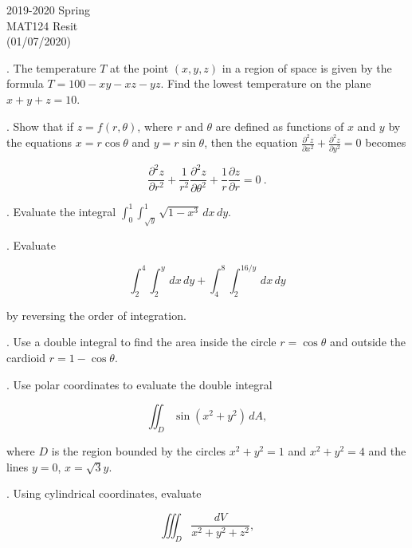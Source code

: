\documentclass{article}
\begin{document}
\large

\begin{center}
2019-2020 Spring \\MAT124 Resit\\(01/07/2020)
\end{center}

. The temperature $T$ at the point $(x,y,z)$ in a region of space is given by the formula $T=100-xy-xz-yz$. Find the lowest temperature on the plane $x+y+z=10$.

\hfill

. Show that if $z=f(r, \theta)$, where $r$ and $\theta$ are defined as functions of $x$ and $y$ by the equations $x=r\cos\theta$ and $y=r\sin\theta$, then the equation $\displaystyle\frac{\partial^2z}{\partial x^2}+\frac{\partial ^2z}{\partial y^2} = 0$ becomes

\begin{equation*}
    \frac{\partial^2z}{\partial r^2}+\frac{1}{r^2}\frac{\partial^2z}{\partial\theta^2}+\frac{1}{r}\frac{\partial z}{\partial r}  = 0\:.
\end{equation*}

\hfill

. Evaluate the integral $\displaystyle \int_0^1\int_{\sqrt y}^1 \sqrt{1-x^3}\,dx\,dy$.

\hfill

. Evaluate

\[\displaystyle \int_2^4\int_2^y\,dx\,dy + \int_4^8\int_2^{16/y}\,dx\,dy\]

\hfill

\noindent by reversing the order of integration.

\hfill

. Use a double integral to find the area inside the circle $r=\cos\theta$ and outside the cardioid $r=1-\cos\theta$.

\hfill

. Use polar coordinates to evaluate the double integral

\[\displaystyle\iint_D\sin\left(x^2+y^2\right)\,dA,\]

\hfill

\noindent where $D$ is the region bounded by the circles $x^2+y^2=1$ and $x^2+y^2=4$ and the lines $y=0$, $x=\sqrt3 y$.

\hfill

. Using cylindrical coordinates, evaluate

\[\iiint_D\frac{dV}{x^2+y^2+z^2},\]
\end{document}
